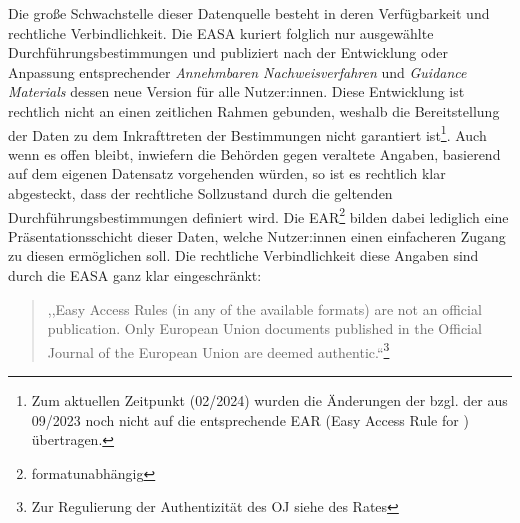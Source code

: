     Die große Schwachstelle dieser Datenquelle besteht in deren Verfügbarkeit und rechtliche Verbindlichkeit.
    Die \ac{EASA} kuriert folglich nur ausgewählte Durchführungsbestimmungen und publiziert nach der Entwicklung oder Anpassung entsprechender \textit{Annehmbaren Nachweisverfahren} und \textit{Guidance Materials} dessen neue Version für alle Nutzer:innen.
    Diese Entwicklung ist rechtlich nicht an einen zeitlichen Rahmen gebunden, weshalb die Bereitstellung der Daten zu dem Inkrafttreten der Bestimmungen nicht garantiert ist\footnote{Zum aktuellen Zeitpunkt (02/2024) wurden die Änderungen der  bzgl. der  aus 09/2023 noch nicht auf die entsprechende \ac{EAR} (Easy Access Rule for \atmans) übertragen.}.
    Auch wenn es offen bleibt, inwiefern die Behörden gegen veraltete Angaben, basierend auf dem eigenen Datensatz vorgehenden würden, so ist es rechtlich klar abgesteckt, dass der rechtliche Sollzustand durch die geltenden Durchführungsbestimmungen definiert wird.
    Die \ac{EAR}\footnote{formatunabhängig} bilden dabei lediglich eine Präsentationsschicht dieser Daten, welche Nutzer:innen einen einfacheren Zugang zu diesen ermöglichen soll. 
    Die rechtliche Verbindlichkeit diese Angaben sind durch die \ac{EASA} ganz klar eingeschränkt:

\begin{quote}
    ,,Easy Access Rules (in any of the available formats) are not an official publication. Only European Union documents published in the Official Journal of the European Union are deemed authentic.``\footnote{Zur Regulierung der Authentizität des \ac{OJ} siehe  des Rates} \cite{easa_xml_export}
\end{quote}
    
     